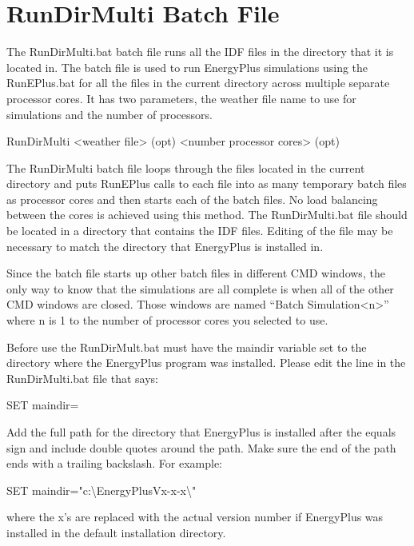 \section{RunDirMulti Batch File}\label{rundirmulti-batch-file}

The RunDirMulti.bat batch file runs all the IDF files in the directory that it is located in. The batch file is used to run EnergyPlus simulations using the RunEPlus.bat for all the files in the current directory across multiple separate processor cores. It has two parameters, the weather file name to use for simulations and the number of processors.

RunDirMulti \textless{}weather file\textgreater{} (opt) \textless{}number processor cores\textgreater{} (opt)

The RunDirMulti batch file loops through the files located in the current directory and puts RunEPlus calls to each file into as many temporary batch files as processor cores and then starts each of the batch files. No load balancing between the cores is achieved using this method. The RunDirMulti.bat file should be located in a directory that contains the IDF files. Editing of the file may be necessary to match the directory that EnergyPlus is installed in.

Since the batch file starts up other batch files in different CMD windows, the only way to know that the simulations are all complete is when all of the other CMD windows are closed. Those windows are named ``Batch Simulation\textless{}n\textgreater{}'' where n is 1 to the number of processor cores you selected to use.

Before use the RunDirMult.bat must have the maindir variable set to the directory where the EnergyPlus program was installed. Please edit the line in the RunDirMulti.bat file that says:

SET maindir=

Add the full path for the directory that EnergyPlus is installed after the equals sign and include double quotes around the path. Make sure the end of the path ends with a trailing backslash. For example:

SET maindir="c:\textbackslash{}EnergyPlusVx-x-x\textbackslash{}"

where the x's are replaced with the actual version number if EnergyPlus was installed in the default installation directory.
